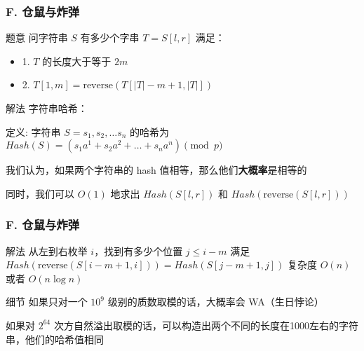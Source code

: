 \renewcommand{\problemname}{F. 仓鼠与炸弹}

\begin{frame}\frametitle{\problemname}
    \begin{block}{题意}
        问字符串 $S$ 有多少个字串 $T = S[l,r]$ 满足：

		\begin{itemize}
			\item 1. $T$ 的长度大于等于 $2m$
			\item 2. $T[1,m] = \mathrm{reverse}(T[|T|-m+1,|T|])$
		\end{itemize}
    \end{block}

    \pause

	\begin{block}{解法}
	字符串哈希：

	定义: 字符串 $S = s_1, s_2, \dots s_n$ 的哈希为 $Hash(S) = (s_1 a^1 + s_2 a^2 + \dots + s_n a^n) \pmod{p}$

	我们认为，如果两个字符串的 hash 值相等，那么他们\textbf{大概率}是相等的
	
	同时，我们可以 $O(1)$ 地求出 $Hash(S[l,r])$ 和 $Hash(\mathrm{reverse}(S[l,r]))$
	\end{block}
\end{frame}

\begin{frame}\frametitle{\problemname}
	\begin{block}{解法}
	从左到右枚举 $i$，找到有多少个位置 $j\le i-m$ 满足 $Hash(\mathrm{reverse}(S[i-m+1,i]))=Hash(S[j-m+1,j])$
	复杂度 $O(n)$ 或者 $O(n\log n)$
	\end{block}

	\begin{block}{细节}
	如果只对一个 $10^9$ 级别的质数取模的话，大概率会 WA（生日悖论）

	如果对 $2^{64}$ 次方自然溢出取模的话，可以构造出两个不同的长度在1000左右的字符串，他们的哈希值相同
	\end{block}
\end{frame}